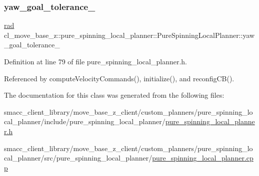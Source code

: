 \subsubsection{\texorpdfstring{yaw\+\_\+goal\+\_\+tolerance\+\_\+}{yaw\_goal\_tolerance\_}}
{\footnotesize\ttfamily \hyperlink{backward__local__planner_8h_a640effbe91ae9b25d698a883a9e80d96}{rad} cl\+\_\+move\+\_\+base\+\_\+z\+::pure\+\_\+spinning\+\_\+local\+\_\+planner\+::\+Pure\+Spinning\+Local\+Planner\+::yaw\+\_\+goal\+\_\+tolerance\+\_\+\hspace{0.3cm}{\ttfamily [private]}}



Definition at line 79 of file pure\+\_\+spinning\+\_\+local\+\_\+planner.\+h.



Referenced by compute\+Velocity\+Commands(), initialize(), and reconfig\+C\+B().



The documentation for this class was generated from the following files\+:\begin{DoxyCompactItemize}
\item 
smacc\+\_\+client\+\_\+library/move\+\_\+base\+\_\+z\+\_\+client/custom\+\_\+planners/pure\+\_\+spinning\+\_\+local\+\_\+planner/include/pure\+\_\+spinning\+\_\+local\+\_\+planner/\hyperlink{pure__spinning__local__planner_8h}{pure\+\_\+spinning\+\_\+local\+\_\+planner.\+h}\item 
smacc\+\_\+client\+\_\+library/move\+\_\+base\+\_\+z\+\_\+client/custom\+\_\+planners/pure\+\_\+spinning\+\_\+local\+\_\+planner/src/pure\+\_\+spinning\+\_\+local\+\_\+planner/\hyperlink{pure__spinning__local__planner_8cpp}{pure\+\_\+spinning\+\_\+local\+\_\+planner.\+cpp}\end{DoxyCompactItemize}
